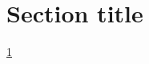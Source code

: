 \documentclass{article}
\begin{document}
 
\section{Section title} \label{s:title}

\ref{s:title}
\end{document}
